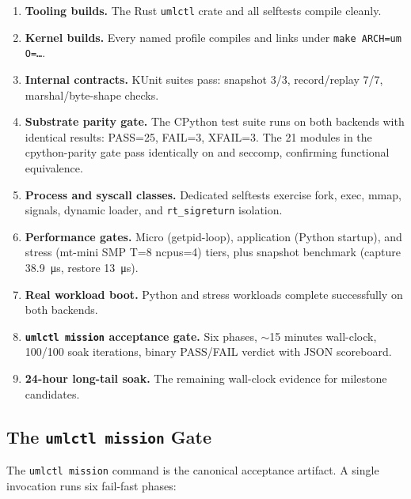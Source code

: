 \begin{enumerate}[leftmargin=2em]
  \item \textbf{Tooling builds.}  The Rust \texttt{umlctl} crate and
    all selftests compile cleanly.

  \item \textbf{Kernel builds.}  Every named profile compiles and
    links under \texttt{make ARCH=um O=\ldots}.

  \item \textbf{Internal contracts.}  KUnit suites pass: snapshot 3/3,
    record/replay 7/7, marshal/byte-shape checks.

  \item \textbf{Substrate parity gate.}  The CPython test suite runs
    on both backends with identical results: PASS=25, FAIL=3, XFAIL=3.
    The 21 modules in the cpython-parity gate pass identically on
    \KVMvTwo{} and seccomp, confirming functional equivalence.

  \item \textbf{Process and syscall classes.}  Dedicated selftests
    exercise fork, exec, mmap, signals, dynamic loader, and
    \texttt{rt\_sigreturn} isolation.

  \item \textbf{Performance gates.}  Micro (getpid-loop),
    application (Python startup), and stress (mt-mini SMP T=8 ncpus=4)
    tiers, plus snapshot benchmark (capture \SI{38.9}{\micro\second},
    restore \SI{13}{\micro\second}).

  \item \textbf{Real workload boot.}  Python and stress workloads
    complete successfully on both backends.

  \item \textbf{\texttt{umlctl mission} acceptance gate.}
    Six phases, $\sim$15 minutes wall-clock, 100/100 soak iterations,
    binary PASS/FAIL verdict with JSON scoreboard.

  \item \textbf{24-hour long-tail soak.}  The remaining wall-clock
    evidence for milestone candidates.
\end{enumerate}

\subsection{The \texttt{umlctl mission} Gate}

The \texttt{umlctl mission} command is the canonical acceptance
artifact.  A single invocation runs six fail-fast phases:


